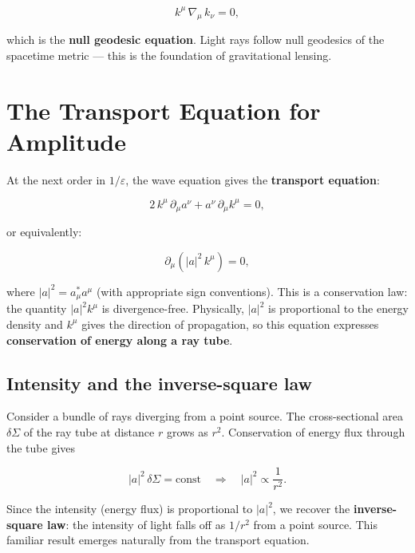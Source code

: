 \begin{equation}
k^\mu\,\nabla_\mu\,k_\nu = 0,
\end{equation}

which is the \textbf{null geodesic equation}. Light rays follow null geodesics of the spacetime metric --- this is the foundation of gravitational lensing.

\section{The Transport Equation for Amplitude}

At the next order in $1/\varepsilon$, the wave equation gives the \textbf{transport equation}:

\begin{equation}
2\,k^\mu\,\partial_\mu a^\nu + a^\nu\,\partial_\mu k^\mu = 0,
\end{equation}

or equivalently:

\begin{equation}
\boxed{\partial_\mu(|a|^2\,k^\mu) = 0,}
\end{equation}

where $|a|^2 = a_\mu^* a^\mu$ (with appropriate sign conventions). This is a conservation law: the quantity $|a|^2 k^\mu$ is divergence-free. Physically, $|a|^2$ is proportional to the energy density and $k^\mu$ gives the direction of propagation, so this equation expresses \textbf{conservation of energy along a ray tube}.

\subsection{Intensity and the inverse-square law}

Consider a bundle of rays diverging from a point source. The cross-sectional area $\delta\Sigma$ of the ray tube at distance $r$ grows as $r^2$. Conservation of energy flux through the tube gives

\begin{equation}
|a|^2\,\delta\Sigma = \text{const} \quad \Longrightarrow \quad |a|^2 \propto \frac{1}{r^2}.
\end{equation}

Since the intensity (energy flux) is proportional to $|a|^2$, we recover the \textbf{inverse-square law}: the intensity of light falls off as $1/r^2$ from a point source. This familiar result emerges naturally from the transport equation.

